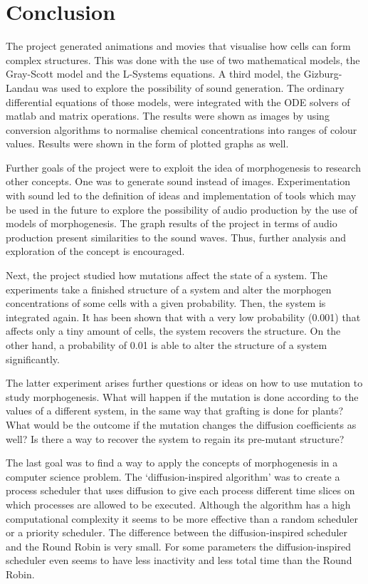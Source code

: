 \chapter{Conclusion}
The project generated animations and movies that visualise how cells can form complex structures. This was done with the use of two mathematical models, the Gray-Scott model and the L-Systems equations. A third model, the  Gizburg-Landau was used to explore the possibility of sound generation. The ordinary differential equations of those models, were integrated with the ODE solvers of matlab and matrix operations. The results were shown as images by using conversion algorithms to normalise chemical concentrations into ranges of colour values. Results were shown in the form of plotted graphs as well.

Further goals of the project were to exploit the idea of morphogenesis to research other concepts. One was to generate sound instead of images. Experimentation with sound led to the definition of ideas and implementation of tools which may be used in the future to explore the possibility of audio production by the use of models of morphogenesis. The graph results of the project in terms of audio production present similarities to the sound waves. Thus, further analysis and exploration of the concept is encouraged.

Next, the project studied how mutations affect the state of a system. The experiments take a finished structure of a system and alter the morphogen concentrations of some cells with a given probability. Then, the system is integrated again. It has been shown that with a very low probability (0.001) that affects only a tiny amount of cells, the system recovers the structure. On the other hand, a probability of 0.01 is able to alter the structure of a system significantly.

The latter experiment arises further questions or ideas on how to use mutation to study morphogenesis. What will happen if the mutation is done according to the values of a different system, in the same way that grafting is done for plants? What would be the outcome if the mutation changes the diffusion coefficients as well? Is there a way to recover the system to regain its pre-mutant structure? 

The last goal was to find a way to apply the concepts of morphogenesis in a computer science problem. The `diffusion-inspired algorithm' was to create a process scheduler that uses diffusion to give each process different time slices on which processes are allowed to be executed. Although the algorithm has a high computational complexity it seems to be more effective than a random scheduler or a priority scheduler. The difference between the diffusion-inspired scheduler and the Round Robin is very small. For some parameters the diffusion-inspired scheduler even seems to have less inactivity and less total time than the Round Robin. 

